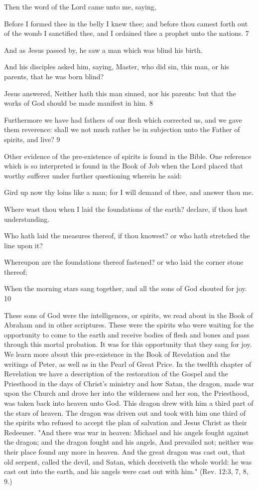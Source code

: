 Then the word of the Lord came unto me, saying,

Before I formed thee in the belly I knew thee; and before thou camest forth out of the womb I
sanctified thee, and I ordained thee a prophet unto the nations. 7

And as Jesus passed by, he saw a man which was blind his birth.

And his disciples asked him, saying, Master, who did sin, this man, or his parents, that he
was born blind?

Jesus answered, Neither hath this man sinned, nor his parents: but that the works of God
should be made manifest in him. 8

Furthermore we have had fathers of our flesh which corrected us, and we gave them
reverence: shall we not much rather be in subjection unto the Father of spirits, and live? 9

Other evidence of the pre-existence of spirits is found in the Bible. One reference which is so
interpreted is found in the Book of Job when the Lord placed that worthy sufferer under
further questioning wherein he said:

Gird up now thy loins like a man; for I will demand of thee, and answer thou me.

Where wast thou when I laid the foundations of the earth? declare, if thou hast
understanding.

Who hath laid the measures thereof, if thou knowest? or who hath stretched the line upon it?

Whereupon are the foundations thereof fastened? or who laid the corner stone thereof;

When the morning stars sang together, and all the sons of God shouted for joy. 10

These sons of God were the intelligences, or spirits, we read about in the Book of Abraham
and in other scriptures. These were the spirits who were waiting for the opportunity to come
to the earth and receive bodies of flesh and bones and pass through this mortal probation. It
was for this opportunity that they sang for joy. We learn more about this pre-existence in the
Book of Revelation and the writings of Peter, as well as in the Pearl of Great Price. In the
twelfth chapter of Revelation we have a description of the restoration of the Gospel and the
Priesthood in the days of Christ's ministry and how Satan, the dragon, made war upon the
Church and drove her into the wilderness and her son, the Priesthood, was taken back into
heaven unto God. This dragon drew with him a third part of the stars of heaven. The dragon
was driven out and took with him one third of the spirits who refused to accept the plan of
salvation and Jesus Christ as their Redeemer. "And there was war in heaven: Michael and his
angels fought against the dragon; and the dragon fought and his angels, And prevailed not;
neither was their place found any more in heaven. And the great dragon was cast out, that old
serpent, called the devil, and Satan, which deceiveth the whole world: he was cast out into
the earth, and his angels were cast out with him." (Rev. 12:3, 7, 8, 9.)

